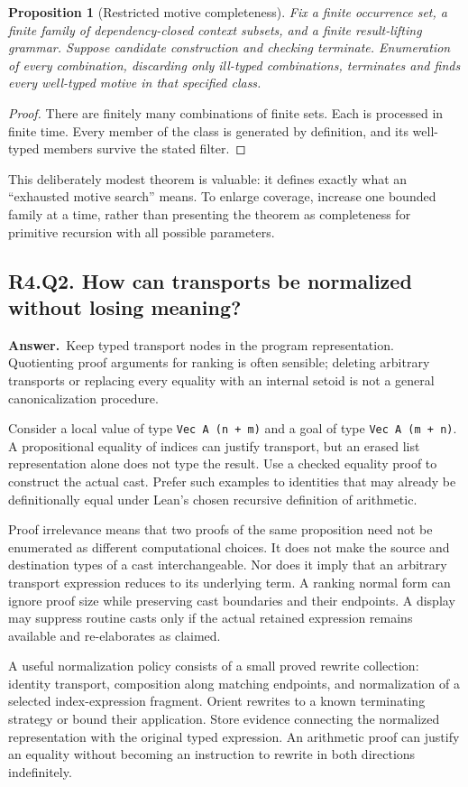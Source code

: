 \documentclass[11pt,a4paper]{article}
\newtheorem{proposition}[theorem]{Proposition}
\theoremstyle{definition}
\theoremstyle{remark}
\newcommand{\code}[1]{\texttt{#1}}
\newcommand{\answer}{\par\noindent\textbf{Answer.}\ }
\newcommand{\qheading}[2]{\subsection{#1. #2}}
\begin{document}
\begin{proposition}[Restricted motive completeness]
Fix a finite occurrence set, a finite family of dependency-closed context
subsets, and a finite result-lifting grammar. Suppose candidate construction
and checking terminate. Enumeration of every combination, discarding only
ill-typed combinations, terminates and finds every well-typed motive in that
specified class.
\end{proposition}
\begin{proof}
There are finitely many combinations of finite sets. Each is processed in finite
time. Every member of the class is generated by definition, and its well-typed
members survive the stated filter.
\end{proof}

This deliberately modest theorem is valuable: it defines exactly what an
``exhausted motive search'' means. To enlarge coverage, increase one bounded
family at a time, rather than presenting the theorem as completeness for
primitive recursion with all possible parameters.

\qheading{R4.Q2}{How can transports be normalized without losing meaning?}
\answer Keep typed transport nodes in the program representation. Quotienting
proof arguments for ranking is often sensible; deleting arbitrary transports
or replacing every equality with an internal setoid is not a general
canonicalization procedure.

Consider a local value of type \code{Vec A (n + m)} and a goal of type
\code{Vec A (m + n)}. A propositional equality of indices can justify transport,
but an erased list representation alone does not type the result. Use a
checked equality proof to construct the actual cast. Prefer such examples to
identities that may already be definitionally equal under Lean's chosen
recursive definition of arithmetic.

Proof irrelevance means that two proofs of the same proposition need not be
enumerated as different computational choices. It does not make the source
and destination types of a cast interchangeable. Nor does it imply that an
arbitrary transport expression reduces to its underlying term. A ranking
normal form can ignore proof size while preserving cast boundaries and their
endpoints. A display may suppress routine casts only if the actual retained
expression remains available and re-elaborates as claimed.

A useful normalization policy consists of a small proved rewrite collection:
identity transport, composition along matching endpoints, and normalization
of a selected index-expression fragment. Orient rewrites to a known terminating
strategy or bound their application. Store evidence connecting the normalized
representation with the original typed expression. An arithmetic proof can
justify an equality without becoming an instruction to rewrite in both
directions indefinitely.
\end{document}
